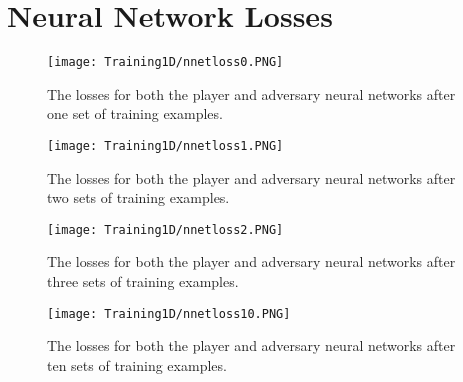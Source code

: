 \documentclass[../main.tex]{subfiles}
\begin{document}
{\section{Neural Network Losses}

\begin{figure}[h]
    \centering
    \texttt{[image: Training1D/nnetloss0.PNG]}
    \caption{The losses for both the player and adversary neural networks after one set of training examples.}
    \label{fig:nnetlosses0}
\end{figure}

\begin{figure}[h]
    \centering
    \texttt{[image: Training1D/nnetloss1.PNG]}
    \caption{The losses for both the player and adversary neural networks after two sets of training examples.}
    \label{fig:nnetlosses1}
\end{figure}

\begin{figure}[h]
    \centering
    \texttt{[image: Training1D/nnetloss2.PNG]}
    \caption{The losses for both the player and adversary neural networks after three sets of training examples.}
    \label{fig:nnetlosses2}
\end{figure}

\begin{figure}[h]
    \centering
    \texttt{[image: Training1D/nnetloss10.PNG]}
    \caption{The losses for both the player and adversary neural networks after ten sets of training examples.}
    \label{fig:nnetlosses10}
\end{figure}

} %
\onlyinsubfile{}
\end{document}
